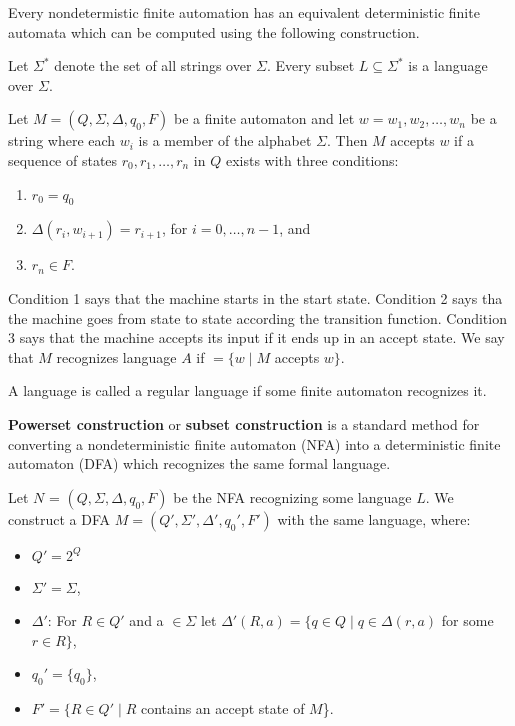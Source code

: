 Every nondetermistic finite automation has an equivalent deterministic finite automata which can be computed using the following construction.

\begin{mydef}
Let $\Sigma^\ast$ denote the set of all strings over $\Sigma$. Every subset $L \subseteq \Sigma^\ast$ is a language over $\Sigma$.
\end{mydef}

\begin{mydef}
Let $M = (Q, \Sigma, \Delta, q_{0}, F)$ be a finite automaton and let $w = w_{1}, w_{2}, \dots, w_{n}$ be a string where each $w_{i}$ is a member of the alphabet $\Sigma$. Then $M$ accepts $w$ if a sequence of states $r_{0}, r_{1}, \dots, r_{n}$ in $Q$ exists with three conditions:
\begin{enumerate}
\item $r_{0} = q_{0}$
\item $\Delta(r_{i}, w_{i+1}) = r_{i+1}$, for $i = 0, \dots, n - 1$, and
\item $r_{n} \in F$.
\end{enumerate}

Condition 1 says that the machine starts in the start state. Condition 2 says tha the machine goes from state to state according the transition function. Condition 3 says that the machine accepts its input if it ends up in an accept state. We say that $M$ recognizes language $A$ if $ = \{w \mid M$ accepts $w\}$.
\end{mydef}

\begin{mydef}
A language is called a regular language if some finite automaton recognizes it.
\end{mydef}

\begin{mydef}
\textbf{Powerset construction} or \textbf{subset construction} is a standard method for converting a nondeterministic finite automaton (NFA) into a deterministic finite automaton (DFA) which recognizes the same formal language.

\newpage 
Let $N$ = $(Q, \Sigma, \Delta, q_{0}, F)$ be the NFA recognizing some language $L$. We construct a DFA $M = (Q', \Sigma', \Delta', q_{0}', F')$ with the same language, where:
\begin{itemize}
  \item $Q' = 2^Q$
  \item $\Sigma' = \Sigma$,
  \item $\Delta'$: For $R \in Q'$ and a $\in \Sigma$ let $\Delta'(R, a) = \{q \in Q \mid q \in \Delta(r, a)$ for some $r \in R\}$,
  \item $q_{0}' = \{q_{0}\}$,
  \item $F' = \{R \in Q' \mid R$ contains an accept state of $M$\}.
\end{itemize}

\end{mydef}

